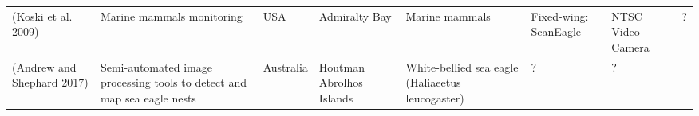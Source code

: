 \documentclass[]{interact}
\theoremstyle{plain}%
\theoremstyle{definition}
\theoremstyle{remark}
\begin{document}
\begin{longtable}[]{@{}llllllll@{}}
\begin{minipage}[t]{0.11\columnwidth}
(Koski et al. 2009)\strut
\end{minipage} & \begin{minipage}[t]{0.18\columnwidth}\raggedright\strut
Marine mammals monitoring\strut
\end{minipage} & \begin{minipage}[t]{0.03\columnwidth}\raggedright\strut
USA\strut
\end{minipage} & \begin{minipage}[t]{0.14\columnwidth}\raggedright\strut
Admiralty Bay\strut
\end{minipage} & \begin{minipage}[t]{0.10\columnwidth}\raggedright\strut
Marine mammals\strut
\end{minipage} & \begin{minipage}[t]{0.09\columnwidth}\raggedright\strut
Fixed-wing: ScanEagle\strut
\end{minipage} & \begin{minipage}[t]{0.11\columnwidth}\raggedright\strut
NTSC Video Camera\strut
\end{minipage} & \begin{minipage}[t]{0.01\columnwidth}\raggedright\strut
?\strut
\end{minipage}\tabularnewline
\begin{minipage}[t]{0.11\columnwidth}\raggedright\strut
(Andrew and Shephard 2017)\strut
\end{minipage} & \begin{minipage}[t]{0.18\columnwidth}\raggedright\strut
Semi-automated image processing tools to detect and map sea eagle
nests\strut
\end{minipage} & \begin{minipage}[t]{0.03\columnwidth}\raggedright\strut
Australia\strut
\end{minipage} & \begin{minipage}[t]{0.14\columnwidth}\raggedright\strut
Houtman Abrolhos Islands\strut
\end{minipage} & \begin{minipage}[t]{0.10\columnwidth}\raggedright\strut
White-bellied sea eagle (Haliaeetus leucogaster)\strut
\end{minipage} & \begin{minipage}[t]{0.09\columnwidth}\raggedright\strut
?\strut
\end{minipage} & \begin{minipage}[t]{0.11\columnwidth}\raggedright\strut
?\strut
\end{minipage} & \begin{minipage}[t]{0.01\columnwidth}\raggedright\strut

\end{minipage}
\end{longtable}
\end{document}
